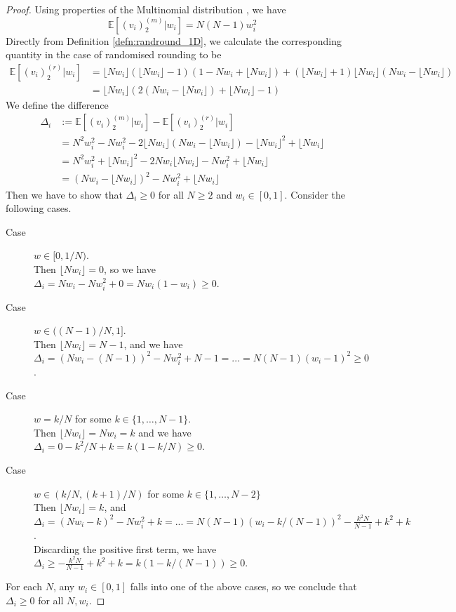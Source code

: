 \documentclass[fleqn]{article}
\theoremstyle{definition}
\newcommand{\E}{\mathbb{E}}
\newcommand{\flnw}{\lfloor Nw_i \rfloor }
\begin{document}
\begin{proof}
Using properties of the Multinomial distribution \citep{mosimann1962}, we have
\begin{equation*}
\E[(v_i)_2^{(m)} | w_i]  = N(N-1)w_i^2
\end{equation*}
Directly from Definition \ref{defn:randround_1D}, we calculate the corresponding quantity in the case of randomised rounding to be
\begin{align*}
\E[(v_i)_2^{(r)} | w_i] &= \flnw (\flnw -1) (1 - Nw_i + \flnw) + (\flnw +1) \flnw (Nw_i - \flnw) \\
&= \flnw \left( 2(Nw_i - \flnw) + \flnw -1 \right)
\end{align*}
We define the difference 
\begin{align*}
\Delta_i &:= \E[(v_i)_2^{(m)} | w_i] - \E[(v_i)_2^{(r)} | w_i] \\
&= N^2w_i^2 - Nw_i^2 - 2\flnw(Nw_i - \flnw) - \flnw^2 + \flnw \\
&= N^2 w_i^2 + \flnw^2 -2Nw_i \flnw - Nw_i^2 + \flnw \\
&= (Nw_i - \flnw)^2 - Nw_i^2 + \flnw 
\end{align*}
Then we have to show that $\Delta_i \geq 0$ for all $N\geq 2$ and $w_i \in [0,1]$. Consider the following cases.
\begin{description}
\item[Case] $w \in [0, 1/N)$.\\
Then $\flnw = 0$, so we have\\ $\Delta_i = Nw_i - Nw_i^2 + 0 = Nw_i(1-w_i) \geq 0$.
\item[Case] $w \in ((N-1)/N, 1]$.\\
Then $\flnw = N-1$, and we have \\ $\Delta_i = (Nw_i - (N-1))^2 - Nw_i^2 + N -1 =...= N(N-1)(w_i -1)^2 \geq 0$.
\item[Case] $w=k/N$ for some $k \in \{1, \dots, N-1\}$. \\
Then $\flnw = Nw_i = k$ and we have\\
$\Delta_i = 0 - k^2/N + k = k(1- k/N) \geq 0$.
\item[Case] $w \in (k/N, (k+1)/N )$ for some $k \in \{1, \dots, N-2\}$ \\
Then $\flnw = k$, and \\
$\Delta_i = (Nw_i - k)^2 - Nw_i^2 + k = ... = N(N-1)(w_i - k/(N-1))^2 - \frac{k^2N}{N-1} + k^2 +k$.\\
Discarding the positive first term, we have $\Delta_i \geq - \frac{k^2N}{N-1} + k^2 +k = k(1- k/(N-1)) \geq 0$.
\end{description}
For each $N$, any $w_i \in [0,1]$ falls into one of the above cases, so we conclude that $\Delta_i \geq 0$ for all $N, w_i$.
\end{proof}



\end{document}
